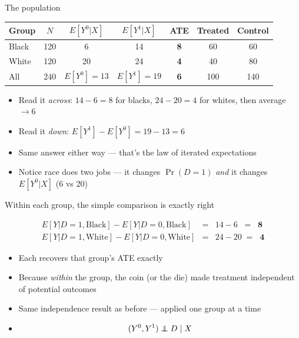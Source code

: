 \documentclass{beamer}
\newcommand\independent{\protect\mathpalette{\protect\independenT}{\perp}}
\def\independenT#1#2{\mathrel{\rlap{$#1#2$}\mkern2mu{#1#2}}}
\begin{document}
\begin{frame}{The population}

\centering
{\small
\begin{tabular}{lcccccc}
\toprule
Group & $N$ & $E[Y^0|X]$ & $E[Y^1|X]$ & ATE & Treated & Control \\
\midrule
Black & 120 & 6  & 14 & \textbf{8} & 60 & 60 \\
White & 120 & 20 & 24 & \textbf{4} & 40 & 80 \\
\midrule
All   & 240 & $E[Y^0]=13$ & $E[Y^1]=19$ & \textbf{6} & 100 & 140 \\
\bottomrule
\end{tabular}}

\vspace{0.8em}
\raggedright

\begin{itemize}
\item Read it \emph{across}: $14-6=8$ for blacks, $24-20=4$ for whites, then average $\to 6$
\item Read it \emph{down}: $E[Y^1] - E[Y^0] = 19 - 13 = 6$
\item Same answer either way --- that's the law of iterated expectations
\item Notice race does two jobs --- it changes $\Pr(D=1)$ \emph{and} it changes $E[Y^0|X]$ (6 vs 20)
\end{itemize}

\end{frame}


\begin{frame}{Within each group, the simple comparison is exactly right}

\begin{eqnarray*}
E[Y|D=1,\text{Black}] - E[Y|D=0,\text{Black}] &=& 14 - 6 \;\;=\;\; \textbf{8} \\
E[Y|D=1,\text{White}] - E[Y|D=0,\text{White}] &=& 24 - 20 \;=\;\; \textbf{4}
\end{eqnarray*}

\vspace{0.4em}

\begin{itemize}
\item Each recovers that group's ATE exactly
\item Because \emph{within} the group, the coin (or the die) made treatment independent of potential outcomes
\item Same independence result as before --- applied one group at a time
\item $$(Y^0,Y^1) \independent{D} \mid X$$
\end{itemize}

\end{frame}
\end{document}
